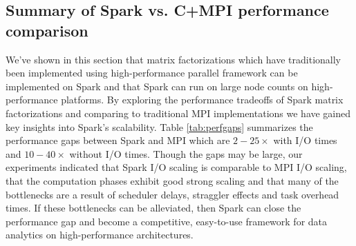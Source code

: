  \subsection{Summary of Spark vs. C+MPI performance comparison}
 \begin{table}[t]
\begin{center}
\end{center}
\caption{Overall summary of MPI and Spark performance gaps.}
\label{tab:perfgaps}
\end{table}
We've shown in this section that matrix factorizations which have traditionally been implemented using high-performance parallel framework can be implemented on Spark and that Spark can run on large node counts on high-performance platforms. By exploring the performance tradeoffs of Spark matrix factorizations and comparing to traditional MPI implementations we have gained key insights into Spark's scalability. Table \ref{tab:perfgaps} summarizes the performance gaps between Spark and MPI which are $2-25\times$ with I/O times and $10-40\times$ without I/O times. Though the gaps may be large, our experiments indicated that Spark I/O scaling is comparable to MPI I/O scaling, that the computation phases exhibit good strong scaling and that many of the bottlenecks are a result of scheduler delays, straggler effects and task overhead times. If these bottlenecks can be alleviated, then Spark can close the performance gap and become a competitive, easy-to-use framework for data analytics on high-performance architectures.   

